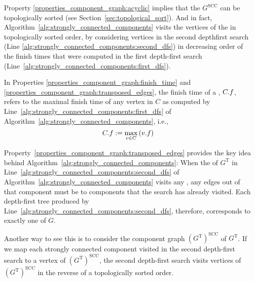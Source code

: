 Property \ref{properties_component_graph:acyclic} implies that the  $G^{\mathrm{SCC}}$ can be topologically sorted (see Section~\ref{sec:topological_sort}).
And in fact, Algorithm~\ref{alg:strongly_connected_components} visits the vertices of the  in topologically sorted order, by considering vertices in the second depthfirst search (Line \ref{alg:strongly_connected_components:second_dfs}) in decreasing order of the finish times that were computed in the first depth-first search (Line~\ref{alg:strongly_connected_components:first_dfs}).

In Properties \ref{properties_component_graph:finish_time} and \ref{properties_component_graph:transposed_edges}, the finish time of a , \(C\mathtt{.}f\), refers to the maximal finish time of any vertex in \(C\) as computed by Line~\ref{alg:strongly_connected_components:first_dfs} of Algorithm~\ref{alg:strongly_connected_components}, i.e., 
\[
C\mathtt{.}f := \max_{v\in C} \left(v\mathtt{.}f\right)
\]

Property~\ref{properties_component_graph:transposed_edges} provides the key idea behind Algorithm~\ref{alg:strongly_connected_components}:
When the  of \(G^{\mathrm{T}}\) in Line~\ref{alg:strongly_connected_components:second_dfs} of Algorithm~\ref{alg:strongly_connected_components} visits any , any edges out of that component must be to components that the search has already visited.
Each depth-first tree produced by Line~\ref{alg:strongly_connected_components:second_dfs}, therefore, corresponds to exactly one  of \(G\).

Another way to see this is to consider the component graph $(G^{\mathrm{T}})^{\mathrm{SCC}}$ of $G^{\mathrm{T}}$. 
If we map each strongly connected component visited in the second depth-first search to a vertex of $(G^{\mathrm{T}})^{\mathrm{SCC}}$, the second depth-first search visits vertices of $(G^{\mathrm{T}})^{\mathrm{SCC}}$ in the reverse of a topologically sorted order. 


